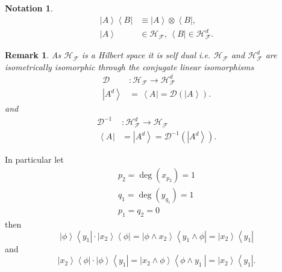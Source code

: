 \documentclass[aps,preprint]{revtex4}%
\newtheorem{notation}[theorem]{Notation}
\newtheorem{remark}[theorem]{Remark}
\begin{document}
\begin{notation}%
\begin{align}
\left\vert A\right\rangle \left\langle B\right\vert  &  \equiv\left\vert
A\right\rangle \otimes\left\langle B\right\vert ,\\
\left\vert A\right\rangle  &  \in\mathcal{H}_{\mathcal{F}},\,\left\langle
B\right\vert \in\mathcal{H}_{\mathcal{F}}^{d}.
\end{align}

\end{notation}

\begin{remark}
As $\mathcal{H}_{\mathcal{F}}$ is a Hilbert space it is self dual i.e.
$\mathcal{H}_{\mathcal{F}}$ and $\mathcal{H}_{\mathcal{F}}^{d}$ are
isometrically isomorphic through the conjugate linear isomorphisms
\begin{align}
\mathcal{D}  &  :\mathcal{H}_{\mathcal{F}}\rightarrow\mathcal{H}_{\mathcal{F}%
}^{d}\\
\left\vert A^{d}\right\rangle  &  =\,\left\langle A^{{}}\right\vert
=\mathcal{D}\left(  \left\vert A^{{}}\right\rangle \right)  .
\end{align}
and
\begin{align}
\mathcal{D}^{-1}  &  :\mathcal{H}_{\mathcal{F}}^{d}\rightarrow\mathcal{H}%
_{\mathcal{F}}\\
\,\left\langle A^{{}}\right\vert  &  =\left\vert A^{d}\right\rangle
=\mathcal{D}^{-1}\left(  \left\vert A^{d}\right\rangle \right)  .
\end{align}

\end{remark}

In particular let
\begin{gather}
p_{2}=\deg\left(  x_{p_{2}}\right)  =1\\
q_{1}=\deg\left(  y_{q_{1}}\right)  =1\\
p_{1}=q_{2}=0
\end{gather}
then
\begin{equation}
\left\vert \phi\right\rangle \left\langle y_{1}\right\vert \cdot\left\vert
x_{2}\right\rangle \left\langle \phi\right\vert =\left\vert \phi\wedge
x_{2}\right\rangle \left\langle y_{1}\wedge\phi\right\vert =\left\vert
x_{2}\right\rangle \left\langle y_{1}\right\vert
\end{equation}
and
\begin{equation}
\left\vert x_{2}\right\rangle \left\langle \phi\right\vert \cdot\left\vert
\phi\right\rangle \left\langle y_{1}\right\vert =\left\vert x_{2}\wedge
\phi\right\rangle \left\langle \phi\wedge y_{1}\ \right\vert =\left\vert
x_{2}\right\rangle \left\langle y_{1}\right\vert .
\end{equation}
\end{document}
